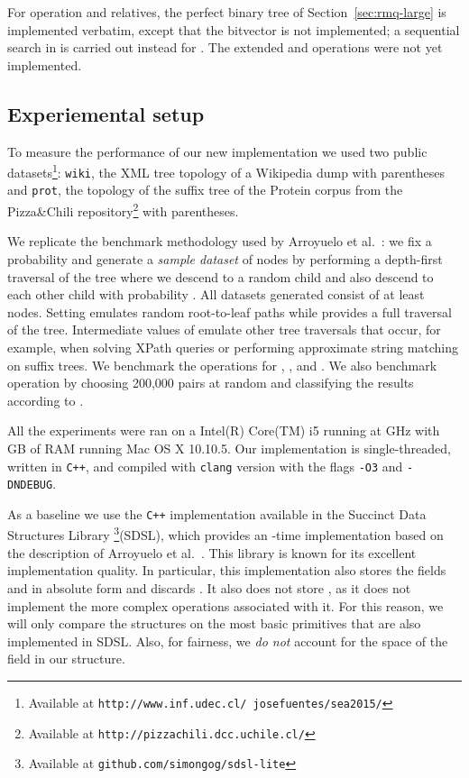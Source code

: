 \documentclass[11pt]{article}
\newcommand{\url}[1]{{\tt #1}}
\newcommand{\0}{\mathit{0}}
\newcommand{\1}{\mathit{1}}
\begin{document}
For operation  and relatives, the perfect binary tree of 
Section~\ref{sec:rmq-large} is implemented verbatim, except that the bitvector
 is not implemented; a sequential search in  is carried out instead
for . The extended  and  operations were not yet
implemented.

\subsection{Experiemental setup}

To measure the performance of our new implementation we used two public
datasets\footnote{Available at
\url{http://www.inf.udec.cl/~josefuentes/sea2015/}}: \texttt{wiki}, the XML tree
topology of a Wikipedia dump with  parentheses and \texttt{prot},
the topology of the suffix tree of the Protein corpus from the Pizza\&Chili
repository\footnote{Available at \url{http://pizzachili.dcc.uchile.cl/}} with
 parentheses. 

We replicate the benchmark methodology used by
Arroyuelo et al.~\cite{ACNS10}: we fix a probability  and generate a
\emph{sample dataset} of nodes by performing a depth-first traversal of the tree
where we descend to a random child and also descend to each other child
with probability .  All datasets generated consist of at least
 nodes.  Setting  emulates random root-to-leaf
paths while  provides a full traversal of the tree. Intermediate
values of  emulate other tree traversals that occur, for example,
when solving XPath queries or performing approximate string matching on suffix 
trees. We benchmark the operations  for ,
, and . We also benchmark operation  by choosing 
200,000 pairs  at random and classifying the results according to .

All the experiments were ran on a Intel(R) Core(TM) i5 running at GHz with
GB of RAM running Mac OS X 10.10.5.  Our implementation is single-threaded,
written in \texttt{C++}, and compiled with \texttt{clang} version
 with the flags \texttt{-O3} and \texttt{-DNDEBUG}.

As a baseline we use the \texttt{C++} implementation available in the
Succinct Data Structures Library \footnote{Available at
\url{github.com/simongog/sdsl-lite}}(SDSL), which provides an -time
implementation based on the description of Arroyuelo et al.~\cite{ACNS10}.
This library is known for its excellent implementation quality. In particular,
this implementation also stores the fields  and  in absolute form
and discards . It also does not store , as it does not implement the
more complex operations associated with it. For this reason, we will only
compare the structures on the most basic primitives 
 that are also implemented in SDSL. Also, for 
fairness, we {\em do not} account for the space of the field  in our
structure.
\end{document}
